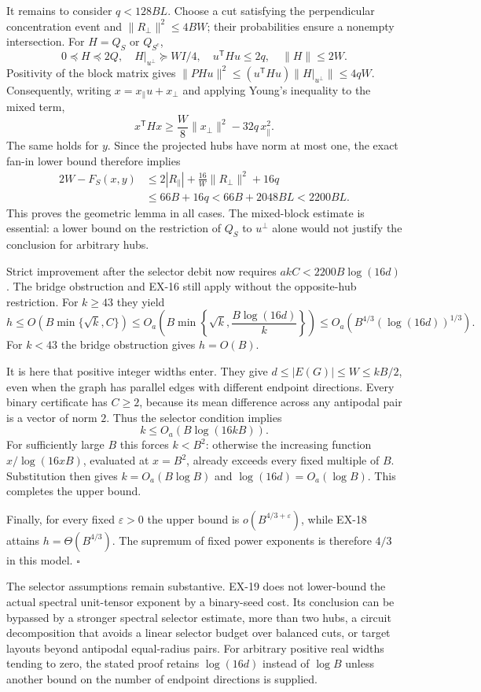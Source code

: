 It remains to consider $q<128BL$.  Choose a cut satisfying the
perpendicular concentration event and
$\|R_\perp\|^2\leq4BW$; their probabilities ensure a nonempty
intersection.  For $H=Q_S$ or $Q_{S^c}$,
\[
 0\preceq H\preceq2Q,\quad
 H|_{u^\perp}\succeq WI/4,\quad
 u^{\mathsf T}Hu\leq2q,\quad \|H\|\leq2W.
\]
Positivity of the block matrix gives
$\|PHu\|^2\leq(u^{\mathsf T}Hu)\|H|_{u^\perp}\|\leq4qW$.
Consequently, writing $x=x_\parallel u+x_\perp$ and applying Young's
inequality to the mixed term,
\[
 x^{\mathsf T}Hx
 \geq\frac W8\|x_\perp\|^2-32q\,x_\parallel^2.
\]
The same holds for $y$.  Since the projected hubs have norm at most one,
the exact fan-in lower bound therefore implies
\[
 \begin{split}
 2W-F_S(x,y)
 &\leq2|R_\parallel|+\frac{16}{W}\|R_\perp\|^2+16q\\
 &\leq66B+16q
 <66B+2048BL
 <2200BL.
 \end{split}
\]
This proves the geometric lemma in all cases.  The mixed-block estimate
is essential: a lower bound on the restriction of $Q_S$ to $u^\perp$
alone would not justify the conclusion for arbitrary hubs.

Strict improvement after the selector debit now requires
$akC<2200B\log(16d)$.  The bridge obstruction and EX-16 still apply
without the opposite-hub restriction.  For $k\geq43$ they yield
\[
 h\leq O\!\left(B\min\{\sqrt k,C\}\right)
 \leq O_a\!\left(
 B\min\left\{\sqrt k,\frac{B\log(16d)}k\right\}\right)
 \leq O_a\!\left(B^{4/3}(\log(16d))^{1/3}\right).
\]
For $k<43$ the bridge obstruction gives $h=O(B)$.

It is here that positive integer widths enter.  They give
$d\leq |E(G)|\leq W\leq kB/2$, even when the graph has parallel edges
with different endpoint directions.  Every binary certificate has
$C\geq2$, because its mean difference across any antipodal pair is a
vector of norm $2$.  Thus the selector condition implies
\[
 k\leq O_a(B\log(16kB)).
\]
For sufficiently large $B$ this forces $k<B^2$: otherwise the increasing
function $x/\log(16xB)$, evaluated at $x=B^2$, already exceeds every
fixed multiple of $B$.  Substitution then gives $k=O_a(B\log B)$ and
$\log(16d)=O_a(\log B)$.  This completes the upper bound.

Finally, for every fixed $\varepsilon>0$ the upper bound is
$o(B^{4/3+\varepsilon})$, while EX-18 attains
$h=\Theta(B^{4/3})$.  The supremum of fixed power exponents is therefore
$4/3$ in this model. \hfill$\square$

The selector assumptions remain substantive.  EX-19 does not lower-bound
the actual spectral unit-tensor exponent by a binary-seed cost.  Its
conclusion can be bypassed by a stronger spectral selector estimate,
more than two hubs, a circuit decomposition that avoids a linear
selector budget over balanced cuts, or target layouts beyond antipodal
equal-radius pairs.  For arbitrary positive real widths tending to zero,
the stated proof retains $\log(16d)$ instead of $\log B$ unless another
bound on the number of endpoint directions is supplied.

